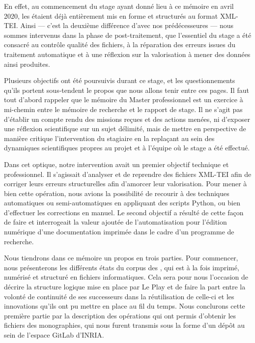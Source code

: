 En effet, au commencement du stage ayant donné lieu à ce mémoire en avril 2020, les \odm{} étaient déjà entièrement mis en forme et structurés au format XML-TEI. Ainsi --- c'est la deuxième différence d'avec nos prédécesseures --- nous sommes intervenus dans la phase de post-traitement, \cad{} que l'essentiel du stage a été consacré au contrôle qualité des fichiers, à la réparation des erreurs issues du traitement automatique et à une réflexion sur la valorisation à mener des données ainsi produites.

Plusieurs objectifs ont été poursuivis durant ce stage, et les questionnements qu'ils portent sous-tendent le propos que nous allons tenir entre ces pages. Il faut tout d'abord rappeler que le mémoire du Master professionnel \tnah{} est un exercice à mi-chemin entre le mémoire de recherche et le rapport de stage. Il ne s'agit pas d'établir un compte rendu des missions reçues et des actions menées, ni d'exposer une réflexion scientifique sur un sujet délimité, mais de mettre en perspective de manière critique l'intervention du stagiaire en la replaçant au sein des dynamiques scientifiques propres au projet et à l'équipe où le stage a été effectué.

Dans cet optique, notre intervention avait un premier objectif technique et professionnel. Il s'agissait d'analyser et de reprendre des fichiers XML-TEI afin de corriger leurs erreurs structurelles afin d'amorcer leur valorisation. Pour mener à bien cette opération, nous avions la possibilité de recourir à des techniques automatiques ou semi-automatiques en appliquant des scripts Python, ou bien d'effectuer les corrections en manuel. Le second objectif a résulté de cette façon de faire et interrogeait la valeur ajoutée de l'automatisation pour l'édition numérique d'une documentation imprimée dans le cadre d'un programme de recherche.

Nous tiendrons dans ce mémoire un propos en trois parties. Pour commencer, nous présenterons les différents états du corpus des \odm{}, qui est à la fois imprimé, numérisé et structuré en fichiers informatiques. Cela sera pour nous l'occasion de décrire la structure logique mise en place par Le Play et de faire la part entre la volonté de continuité de ses successeurs dans la réutilisation de celle-ci et les innovations qu'ils ont pu mettre en place au fil du temps. Nous conclurons cette première partie par la description des opérations qui ont permis d'obtenir les fichiers des monographies, qui nous furent transmis sous la forme d'un dépôt au sein de l'espace GitLab d'INRIA.

